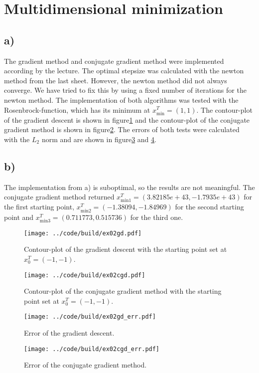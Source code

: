 \section{Multidimensional minimization}

\subsection{a)}
The gradient method and conjugate gradient method were implemented according by the lecture.
The optimal stepsize was calculated with the newton method from the last sheet.
However, the newton method did not always converge.
We have tried to fix this by using a fixed number of iterations for the newton method.
The implementation of both algorithms was tested with the Rosenbrock-function, which has its minimum at $x_\text{min}^T=(1,1)$.
The contour-plot of the gradient descent is shown in figure\ref{fig:gd} and the contour-plot of the conjugate gradient method is shown in figure\ref{fig:cgd}.
The errors of both tests were calculated with the $L_2$ norm and are shown in figure\ref{fig:gd_err} and \ref{fig:cgd_err}.

\subsection{b)}
The implementation from a) is suboptimal, so the results are not meaningful.
The conjugate gradient method returned $x_\text{min1}^T = (3.82185e+43,-1.7935e+43)$ for the first starting point, $x_\text{min2}^T = (-1.38094,-1.84969)$ for the second starting point and $x_\text{min3}^T = (0.711773,0.515736)$ for the third one. 



\begin{figure}[h]
    \centering
    \texttt{[image: ../code/build/ex02gd.pdf]}
    \caption{Contour-plot of the gradient descent with the starting point set at $x_0^T=(-1,-1)$.}
    \label{fig:gd}
\end{figure}

\begin{figure}[h]
    \centering
    \texttt{[image: ../code/build/ex02cgd.pdf]}
    \caption{Contour-plot of the conjugate gradient method with the starting point set at $x_0^T=(-1,-1)$.}
    \label{fig:cgd}
\end{figure}
\begin{figure}[h]
    \centering
    \texttt{[image: ../code/build/ex02gd\_err.pdf]}
    \caption{Error of the gradient descent.}
    \label{fig:gd_err}
\end{figure}

\begin{figure}[h]
    \centering
    \texttt{[image: ../code/build/ex02cgd\_err.pdf]}
    \caption{Error of the conjugate gradient method.}
    \label{fig:cgd_err}
\end{figure}

